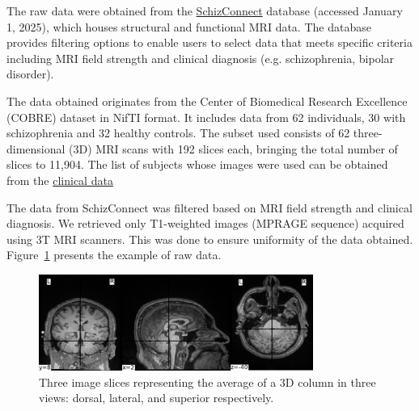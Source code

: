 The raw data were obtained from the \href{http://schizconnect.org}{SchizConnect} database (accessed January 1, 2025), which houses structural and functional MRI data. The database provides filtering options to enable users to select data that meets specific criteria including MRI field strength and clinical diagnosis (e.g. schizophrenia, bipolar disorder).

The data obtained originates from the Center of Biomedical Research Excellence (COBRE) dataset in NifTI format. It includes data from 62 individuals, 30 with schizophrenia and 32 healthy controls. The subset used consists of 62 three-dimensional (3D) MRI scans with 192 slices each, bringing the total number of slices to 11,904. The list of subjects whose images were used can be obtained from the \href{https://github.com/Eager1Beaver/schizo/blob/main/data/clinical_data.csv}{clinical data}

The data from SchizConnect was filtered based on MRI field strength and clinical diagnosis. We retrieved only T1-weighted images (MPRAGE sequence) acquired using 3T MRI scanners. This was done to ensure uniformity of the data obtained. Figure~\ref{fig:raw_mri_volume_slices} presents the example of raw data.
\begin{figure}[h]
    \centering
    \includegraphics[width=0.8\textwidth]{./figs/sample_volume.png} %
    \caption{Three image slices representing the average of a 3D column in three views: dorsal, lateral, and superior respectively.}\label{fig:raw_mri_volume_slices}
\end{figure}

